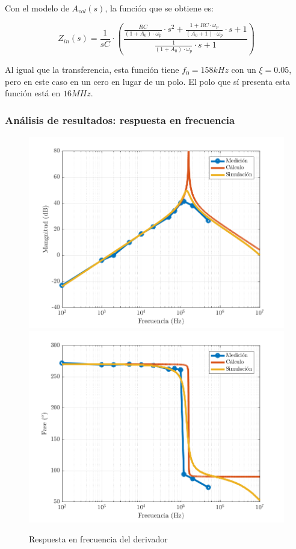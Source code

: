 \documentclass[../../main.tex]{subfiles}
\begin{document}
Con el modelo de $A_{vol}(s)$, la funci\'on que se obtiene es:

\[ Z_{in}(s) = \frac{1}{sC} \cdot \left( \frac{ \frac{RC}{(1+A_0)\cdot \omega_p} \cdot s^2 + \frac{1 + RC \cdot \omega_p}{(A_0+1) \cdot \omega_p} \cdot s + 1 }{\frac{1}{(1+A_0)\cdot\omega_p}\cdot s+1 } \right)\]	

Al igual que la transferencia, esta funci\'on tiene $f_0 = 158kHz$ con un $\xi = 0.05$, pero en este caso en un cero en lugar de un polo. El polo que s\'i presenta esta funci\'on est\'a en $16MHz$. 



\subsubsection{An\'alisis de resultados: respuesta en frecuencia} \label{ssection:d-hf}

\begin{figure}  [H]
	\centering
	\label{fig:d-hf}
	\includegraphics[scale=0.7]{fotos/tc_tp2_ej4_d_Hf_mag.png}
	\includegraphics[scale=0.7]{fotos/tc_tp2_ej4_d_Hf_fase.png}
	\caption{Respuesta en frecuencia del derivador}
\end{figure}
\end{document}
